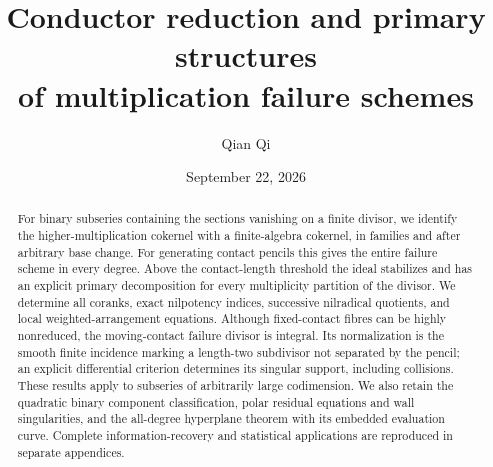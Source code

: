 \documentclass[11pt,reqno]{amsart}
\title[Conductor reduction and multiplication failure]{Conductor reduction and primary structures\\of multiplication failure schemes}
\author{Qian Qi}
\date{September 22, 2026}
\numberwithin{equation}{section}
\theoremstyle{definition}\newtheorem{definition}[theorem]{Definition}
\theoremstyle{remark}\newtheorem{remark}[theorem]{Remark}
\begin{document}
\begin{abstract}
For binary subseries containing the sections vanishing on a finite divisor, we identify the higher-multiplication cokernel with a finite-algebra cokernel, in families and after arbitrary base change. For generating contact pencils this gives the entire failure scheme in every degree. Above the contact-length threshold the ideal stabilizes and has an explicit primary decomposition for every multiplicity partition of the divisor. We determine all coranks, exact nilpotency indices, successive nilradical quotients, and local weighted-arrangement equations. Although fixed-contact fibres can be highly nonreduced, the moving-contact failure divisor is integral. Its normalization is the smooth finite incidence marking a length-two subdivisor not separated by the pencil; an explicit differential criterion determines its singular support, including collisions. These results apply to subseries of arbitrarily large codimension. We also retain the quadratic binary component classification, polar residual equations and wall singularities, and the all-degree hyperplane theorem with its embedded evaluation curve. Complete information-recovery and statistical applications are reproduced in separate appendices.
\end{abstract}
\maketitle















\appendix








\end{document}
